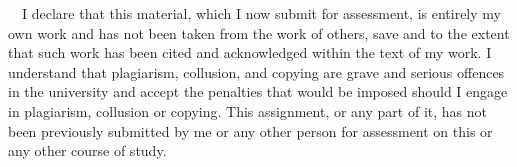 \documentclass[11pt]{article}
\begin{document}
\
\
I declare that this material, which I now submit for assessment, is entirely my own work and has not been taken from the work of others, save and to the extent that such work has been cited and acknowledged within the text of my work. I understand that plagiarism, collusion, and copying are grave and serious offences in the university and accept the penalties that would be imposed should I engage in plagiarism, collusion or copying. This assignment, or any part of it, has not been previously submitted by me or any other person for assessment on this or any other course of study.
\end{document}
